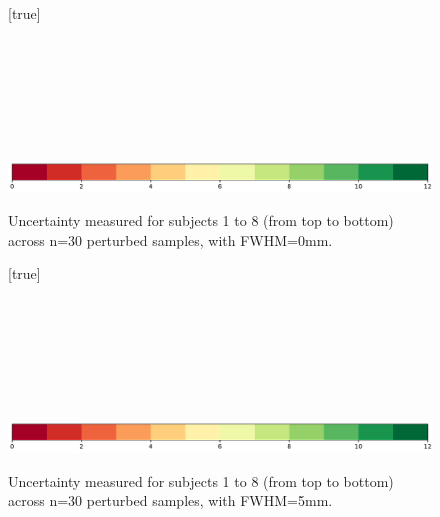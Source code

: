 \documentclass[lettersize,journal]{IEEEtran}
\begin{document}
\begin{landscape}
    \begin{figure}
        \vspace*{-2cm}
        \centering
        [true] \\
         \\
         \\
         \\
         \\
         \\
         \\
         \\
        \includegraphics*[width=.7\linewidth]{figures/colorbar_sigbit_discrete.pdf}
        \caption{Uncertainty measured for subjects 1 to 8 (from top to bottom) across n=30 perturbed samples, with FWHM=0mm. }
        \label{fig:uncertainty-maps-0mm-disc}
    \end{figure}
\end{landscape}

\begin{landscape}
    \begin{figure}
        \vspace*{-2cm}
        \centering
        [true] \\
         \\
         \\
         \\
         \\
         \\
         \\
         \\
        \includegraphics*[width=.7\linewidth]{figures/colorbar_sigbit_discrete.pdf}
        \caption{Uncertainty measured for subjects 1 to 8 (from top to bottom) across n=30 perturbed samples, with FWHM=5mm. }
        \label{fig:uncertainty-maps-5mm-disc}
    \end{figure}
\end{landscape}
\end{document}
